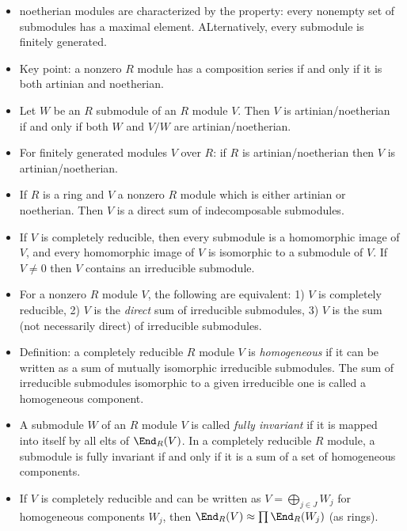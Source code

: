 \documentclass[11pt]{amsart}
\begin{document}
\begin{itemize}
  \item noetherian modules are characterized by the property: every nonempty set of submodules has a maximal element. ALternatively, every submodule is finitely generated. 
  \item Key point: a nonzero $R$ module has a composition series if and only if it is both artinian and noetherian. 
  \item Let $W$ be an $R$ submodule of an $R$ module $V$. Then $V$ is artinian/noetherian if and only if both $W$ and $V/W$ are artinian/noetherian. 
  \item For finitely generated modules $V$ over $R$: if $R$ is artinian/noetherian then $V$ is artinian/noetherian. 
  \item If $R$ is a ring and $V$ a nonzero $R$ module which is either artinian or noetherian. Then $V$ is a direct sum of indecomposable submodules. 
  \item If $V$ is completely reducible, then every submodule is a homomorphic image of $V$, and every homomorphic image of $V$ is isomorphic to a submodule of $V$. If $V\neq 0$ then $V$ contains an irreducible submodule. 
  \item For a nonzero $R$ module $V$, the following are equivalent: 1) $V$ is completely reducible, 2) $V$ is the \emph{direct} sum of irreducible submodules, 3) $V$ is the sum (not necessarily direct) of irreducible submodules. 
  \item Definition: a completely reducible $R$ module $V$ is \emph{homogeneous} if it can be written as a sum of mutually isomorphic irreducible submodules. The sum of irreducible submodules isomorphic to a given irreducible one is called a homogeneous component.
  \item A submodule $W$ of an $R$ module $V$ is called \emph{fully invariant} if it is mapped into itself by all elts of $\End_R(V)$. In a completely reducible $R$ module, a submodule is fully invariant if and only if it is a sum of a set of homogeneous components.
  \item If $V$ is completely reducible and can be written as $V=\bigoplus_{j \in J} W_j$ for homogeneous components $W_j$,  then $\End_R(V)\approx \prod \End_R(W_j)$ (as rings).

\end{itemize}
\end{document}
